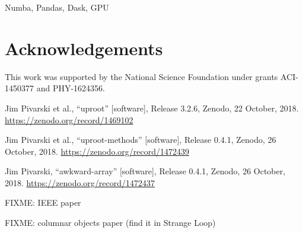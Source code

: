 \documentclass{webofc}
\begin{document}
Numba, Pandas, Dask, GPU

\section{Acknowledgements}

This work was supported by the National Science Foundation under grants ACI-1450377 and PHY-1624356.

\begin{thebibliography}{8}

 Jim Pivarski et al., ``uproot'' [software], Release 3.2.6, Zenodo, 22 October, 2018. \url{https://zenodo.org/record/1469102}

 Jim Pivarski et al., ``uproot-methods'' [software], Release 0.4.1, Zenodo, 26 October, 2018. \url{https://zenodo.org/record/1472439}

 Jim Pivarski, ``awkward-array'' [software], Release 0.4.1, Zenodo, 26 October, 2018. \url{https://zenodo.org/record/1472437}

 FIXME: IEEE paper

 FIXME: columnar objects paper (find it in Strange Loop)

\end{thebibliography}





\end{document}
